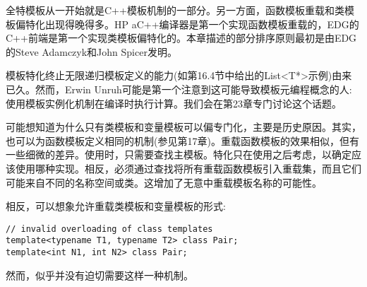 全特模板从一开始就是C++模板机制的一部分。另一方面，函数模板重载和类模板偏特化出现得晚得多。HP aC++编译器是第一个实现函数模板重载的，EDG的C++前端是第一个实现类模板偏特化的。本章描述的部分排序原则最初是由EDG的Steve Adamczyk和John Spicer发明。

模板特化终止无限递归模板定义的能力(如第16.4节中给出的List<T*>示例)由来已久。然而，Erwin Unruh可能是第一个注意到这可能导致模板元编程概念的人:使用模板实例化机制在编译时执行计算。我们会在第23章专门讨论这个话题。

可能想知道为什么只有类模板和变量模板可以偏专门化，主要是历史原因。其实，也可以为函数模板定义相同的机制(参见第17章)。重载函数模板的效果相似，但有一些细微的差异。使用时，只需要查找主模板。特化只在使用之后考虑，以确定应该使用哪种实现。相反，必须通过查找将所有重载函数模板引入重载集，而且它们可能来自不同的名称空间或类。这增加了无意中重载模板名称的可能性。

相反，可以想象允许重载类模板和变量模板的形式:

\begin{lstlisting}[style=styleCXX]
// invalid overloading of class templates
template<typename T1, typename T2> class Pair;
template<int N1, int N2> class Pair;
\end{lstlisting}

然而，似乎并没有迫切需要这样一种机制。